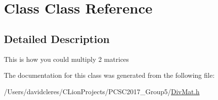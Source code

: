 \hypertarget{class_class}{}\section{Class Class Reference}
\label{class_class}


\subsection{Detailed Description}
This is how you could multiply 2 matrices 

The documentation for this class was generated from the following file\+:\begin{DoxyCompactItemize}
\item 
/\+Users/davidcleres/\+C\+Lion\+Projects/\+P\+C\+S\+C2017\+\_\+\+Group5/\mbox{\hyperlink{_div_mat_8h}{Div\+Mat.\+h}}\end{DoxyCompactItemize}
